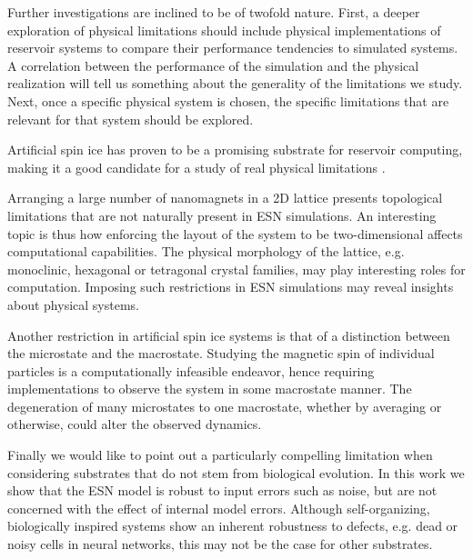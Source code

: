 Further investigations are inclined to be of twofold nature. First, a deeper
exploration of physical limitations should include physical implementations of
reservoir systems to compare their performance tendencies to simulated
systems. A correlation between the performance of the simulation and the
physical realization will tell us something about the generality of the
limitations we study. Next, once a specific physical system is chosen, the
specific limitations that are relevant for that system should be explored.

Artificial spin ice has proven to be a promising substrate for reservoir
computing, making it a good candidate for a study of real physical limitations
\cite{jensen_computation_2018}.

Arranging a large number of nanomagnets in a 2D lattice presents topological
limitations that are not naturally present in ESN simulations. An interesting
topic is thus how enforcing the layout of the system to be two-dimensional
affects computational capabilities. The physical morphology of the lattice,
e.g. monoclinic, hexagonal or tetragonal crystal families, may play interesting
roles for computation. Imposing such restrictions in ESN simulations may reveal
insights about physical systems.

Another restriction in artificial spin ice systems is that of a distinction
between the microstate and the macrostate. Studying the magnetic spin of
individual particles is a computationally infeasible endeavor, hence requiring
implementations to observe the system in some macrostate manner. The
degeneration of many microstates to one macrostate, whether by averaging or
otherwise, could alter the observed dynamics.

Finally we would like to point out a particularly compelling limitation when
considering substrates that do not stem from biological evolution. In this work
we show that the ESN model is robust to input errors such as noise, but are not
concerned with the effect of internal model errors. Although self-organizing,
biologically inspired systems show an inherent robustness to defects, e.g. dead
or noisy cells in neural networks, this may not be the case for other
substrates.

